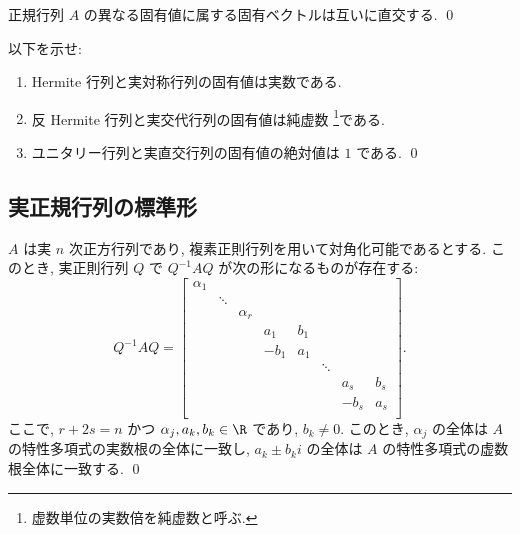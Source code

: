 \documentclass[12pt,twoside]{jarticle}
\begin{document}
\begin{question}
  正規行列 $A$ の異なる固有値に属する固有ベクトルは互いに直交する.  \qed
\end{question}


\begin{question}
  以下を示せ:
  \begin{enumerate}
  \item Hermite 行列と実対称行列の固有値は実数である.
  \item 反 Hermite 行列と実交代行列の固有値は純虚数%
    \footnote{虚数単位の実数倍を純虚数と呼ぶ.}である.
  \item ユニタリー行列と実直交行列の固有値の絶対値は $1$ である.
    \qed
  \end{enumerate}
\end{question}


\subsection{実正規行列の標準形}


\begin{question}[半単純実行列の標準形]
\label{q:real-semisimple}
  $A$ は実 $n$ 次正方行列であり, 複素正則行列を用いて対角化可能であるとする.
  このとき, 実正則行列 $Q$ で $Q^{-1}AQ$ が次の形になるものが存在する:
  \begin{equation*}
    Q^{-1}AQ =
    \begin{bmatrix}
      \alpha_1 &        &          &       &     &        &       &     \\
               & \ddots &          &       &     &        &       &     \\
               &        & \alpha_r &       &     &        &       &     \\
               &        &          &   a_1 & b_1 &        &       &     \\
               &        &          & - b_1 & a_1 &        &       &     \\
               &        &          &       &     & \ddots &       &     \\
               &        &          &       &     &        &   a_s & b_s \\
               &        &          &       &     &        & - b_s & a_s \\
    \end{bmatrix}.
  \end{equation*}
  ここで, $r+2s=n$ かつ $\alpha_j,a_k,b_k\in\R$ であり, $b_k\ne 0$. 
  このとき, $\alpha_j$ の全体は $A$ の特性多項式の実数根の全体に一致し,
  $a_k\pm b_k i$ の全体は $A$ の特性多項式の虚数根全体に一致する. \qed
\end{question}
\end{document}
